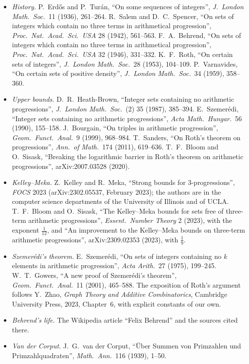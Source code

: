 \begin{itemize}
\item \emph{History.} P.~Erdős and P.~Turán, ``On some sequences of integers'', \emph{J.\ London Math.\ Soc.}\ 11 (1936), 261--264. R.~Salem and D.~C.~Spencer, ``On sets of integers which contain no three terms in arithmetical progression'', \emph{Proc.\ Nat.\ Acad.\ Sci.\ USA} 28 (1942), 561--563. F.~A.~Behrend, ``On sets of integers which contain no three terms in arithmetical progression'', \emph{Proc.\ Nat.\ Acad.\ Sci.\ USA} 32 (1946), 331--332. K.~F.~Roth, ``On certain sets of integers'', \emph{J.\ London Math.\ Soc.}\ 28 (1953), 104--109. P.~Varnavides, ``On certain sets of positive density'', \emph{J.\ London Math.\ Soc.}\ 34 (1959), 358--360.
\item \emph{Upper bounds.} D.~R.~Heath-Brown, ``Integer sets containing no arithmetic progressions'', \emph{J.\ London Math.\ Soc.}\ (2) 35 (1987), 385--394. E.~Szemerédi, ``Integer sets containing no arithmetic progressions'', \emph{Acta Math.\ Hungar.}\ 56 (1990), 155--158. J.~Bourgain, ``On triples in arithmetic progression'', \emph{Geom.\ Funct.\ Anal.}\ 9 (1999), 968--984. T.~Sanders, ``On Roth's theorem on progressions'', \emph{Ann.\ of Math.}\ 174 (2011), 619--636. T.~F.~Bloom and O.~Sisask, ``Breaking the logarithmic barrier in Roth's theorem on arithmetic progressions'', arXiv:2007.03528 (2020).
\item \emph{Kelley--Meka.} Z.~Kelley and R.~Meka, ``Strong bounds for 3-progressions'', \emph{FOCS} 2023 (arXiv:2302.05537, February 2023); the authors are in the computer science departments of the University of Illinois and of UCLA. T.~F.~Bloom and O.~Sisask, ``The Kelley--Meka bounds for sets free of three-term arithmetic progressions'', \emph{Essent.\ Number Theory} 2 (2023), with the exponent $\frac1{12}$, and ``An improvement to the Kelley--Meka bounds on three-term arithmetic progressions'', arXiv:2309.02353 (2023), with $\frac19$.
\item \emph{Szemerédi's theorem.} E.~Szemerédi, ``On sets of integers containing no $k$ elements in arithmetic progression'', \emph{Acta Arith.}\ 27 (1975), 199--245. W.~T.~Gowers, ``A new proof of Szemerédi's theorem'', \emph{Geom.\ Funct.\ Anal.}\ 11 (2001), 465--588. The exposition of Roth's argument follows Y.~Zhao, \emph{Graph Theory and Additive Combinatorics}, Cambridge University Press, 2023, Chapter~6, with explicit constants of our own.
\item \emph{Behrend's life.} The Wikipedia article ``Felix Behrend'' and the sources cited there.
\item \emph{Van der Corput.} J.~G.~van der Corput, ``Über Summen von Primzahlen und Primzahlquadraten'', \emph{Math.\ Ann.}\ 116 (1939), 1--50.
\end{itemize}
